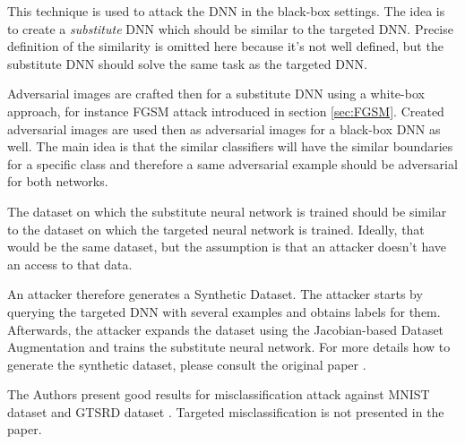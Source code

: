 This technique is used to attack the DNN in the black-box settings. The idea is to create a \textit{substitute} DNN which should be similar to the targeted DNN. Precise definition of the similarity is omitted here because it's not well defined, but the substitute DNN should solve the same task as the targeted DNN.

Adversarial images are crafted then for a substitute DNN using a white-box approach, for instance FGSM attack introduced in section \ref{sec:FGSM}. Created adversarial images are used then as adversarial images for a black-box DNN as well. The main idea is that the similar classifiers will have the similar boundaries for a specific class and therefore a same adversarial example should be adversarial for both networks. 

The dataset on which the substitute neural network is trained should be similar to the dataset on which the targeted neural network is trained. Ideally, that would be the same dataset, but the assumption is that an attacker doesn't have an access to that data. 

An attacker therefore generates a Synthetic Dataset. The attacker starts by querying the targeted DNN with several examples and obtains labels for them. Afterwards, the attacker expands the dataset using the Jacobian-based Dataset Augmentation and trains the substitute neural network. For more details how to generate the synthetic dataset, please consult the original paper  \cite{DBLP:journals/corr/PapernotMGJCS16}.

The Authors present good results for misclassification attack against MNIST dataset and GTSRD dataset \cite{datasetGTSRD}. Targeted misclassification is not presented in the paper.